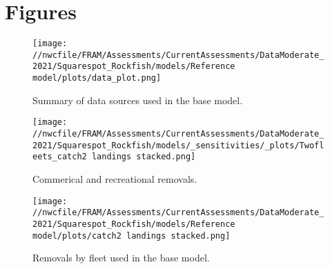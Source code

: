 \documentclass[11pt,
  english,
  a4paper,
]{article}
\begin{document}


\clearpage

\clearpage


\hypertarget{figures}{%
\section{Figures}\label{figures}}

\leavevmode\tagmcend\tagstructend


\begin{figure}
\centering
\texttt{[image: //nwcfile/FRAM/Assessments/CurrentAssessments/DataModerate\_2021/Squarespot\_Rockfish/models/Reference model/plots/data\_plot.png]}
\caption{Summary of data sources used in the base model.\label{fig:data-plot}}
\end{figure}

\tagmcend\tagstructend


\begin{figure}
\centering
\texttt{[image: //nwcfile/FRAM/Assessments/CurrentAssessments/DataModerate\_2021/Squarespot\_Rockfish/models/\_sensitivities/\_plots/Twofleets\_catch2 landings stacked.png]}
\caption{Commerical and recreational removals.\label{fig:twofleetcatch}}
\end{figure}

\tagmcend\tagstructend


\begin{figure}
\centering
\texttt{[image: //nwcfile/FRAM/Assessments/CurrentAssessments/DataModerate\_2021/Squarespot\_Rockfish/models/Reference model/plots/catch2 landings stacked.png]}
\caption{Removals by fleet used in the base model.\label{fig:catch}}
\end{figure}

\tagmcend\tagstructend

\end{document}
